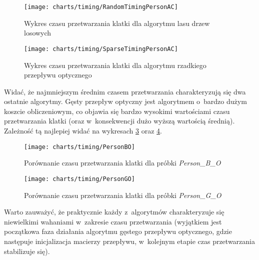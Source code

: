    \newpage
      \begin{figure}[!ht]
        \centering
        \texttt{[image: charts/timing/RandomTimingPersonAC]}
        \caption[Wykres czasu przetwarzania klatki dla algorytmu lasu drzew losowych]
                {Wykres czasu przetwarzania klatki dla algorytmu lasu drzew losowych}
        \label{fig:RandomTimingPersonAC}
      \end{figure}

      \begin{figure}[!ht]
        \centering
        \texttt{[image: charts/timing/SparseTimingPersonAC]}
        \caption[Wykres czasu przetwarzania klatki dla algorytmu rzadkiego przepływu optycznego]
                {Wykres czasu przetwarzania klatki dla algorytmu rzadkiego przepływu optycznego}
        \label{fig:SparseTimingPersonAC}
      \end{figure}

    Widać, że najmniejszym średnim czasem przetwarzania charakteryzują się dwa ostatnie algorytmy. Gęsty przepływ optyczny jest algorytmem o~bardzo dużym koszcie obliczeniowym, co objawia się bardzo wysokimi wartościami czasu przetwarzania klatki (oraz w~konsekwencji dużo wyższą wartością średnią). Zależność tą najlepiej widać na wykresach \ref{fig:PersonBO} oraz \ref{fig:PersonGO}.

      \begin{figure}[!ht]
        \centering
        \texttt{[image: charts/timing/PersonBO]}
        \caption[Porównanie czasu przetwarzania klatki dla próbki Person\_B\_O]
                {Porównanie czasu przetwarzania klatki dla próbki \textit{Person\_B\_O}}
        \label{fig:PersonBO}
      \end{figure}

      \begin{figure}[!ht]
        \centering
        \texttt{[image: charts/timing/PersonGO]}
        \caption[Porównanie czasu przetwarzania klatki dla próbki Person\_G\_O]
                {Porównanie czasu przetwarzania klatki dla próbki \textit{Person\_G\_O}}
        \label{fig:PersonGO}
      \end{figure}

    Warto zauważyć, że praktycznie każdy z~algorytmów charakteryzuje się niewielkimi wahaniami w~zakresie czasu przetwarzania (wyjątkiem jest początkowa faza działania algorytmu gęstego przepływu optycznego, gdzie następuje inicjalizacja macierzy przepływu, w~kolejnym etapie czas przetwarzania stabilizuje się).

